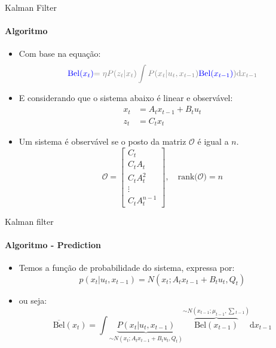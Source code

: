 \documentclass[aspectratio=169]{beamer}
\begin{document}
\begin{frame}[c]{Kalman Filter}
    \framesubtitle{Algoritmo}
    \begin{itemize}
        \item Com base na equação:
        \begin{equation*}
            \color{blue}{\text{Bel}}(x_t)  \color{gray}{=\eta P(z_t|x_t)\displaystyle\int P(x_t| u_t,x_{t-1})}\color{blue}{\color{blue}{\text{Bel}}(x_{t-1})}\color{gray}{)\text{d}x_{t-1}}
        \end{equation*}
        \item E considerando que o sistema abaixo é linear e observável:
        \begin{equation*}
            \begin{split}
                x_t &= A_t x_{t-1} + B_t u_t\\ 
                z_t &= C_t x_t
            \end{split}
        \end{equation*}
        \item Um sistema é observável se o posto da matriz $\mathcal {O}$ é igual a $n$.
        \begin{equation*}
            \mathcal {O}={\begin{bmatrix}C_t\\C_tA_t\\C_tA^{2}_t\\\vdots \\C_tA^{n-1}_t\end{bmatrix}, \quad \text{rank}(\mathcal {O}}) = n
        \end{equation*}
    \end{itemize}
\end{frame}


\begin{frame}[c]{Kalman filter}
    \framesubtitle{Algoritmo - Prediction}
    \begin{itemize}
        \item Temos a função de probabilidade do sistema, expressa por:
        \begin{equation*}
            p(x_t| u_t, x_{t-1})= N\left(x_t; A_tx_{t-1}+ B_tu_t, Q_t\right)
        \end{equation*}   
        \item ou seja:
        \begin{equation*}
            \overline{\text{Bel}}(x_t)  = \displaystyle\int\underbrace{P(x_t|u_t, x_{t-1})}_{\sim N\left(x_t; A_t x_{t-1}+ B_tu_t, Q_t\right)} \overbrace{\text{Bel}(x_{t-1})}^{\sim N\left(x_{t-1}; \mu_{t-1}, \textstyle\sum {}_{t-1}\right)}\text{d}x_{t-1}
        \end{equation*}
    \end{itemize}
\end{frame}
\end{document}
